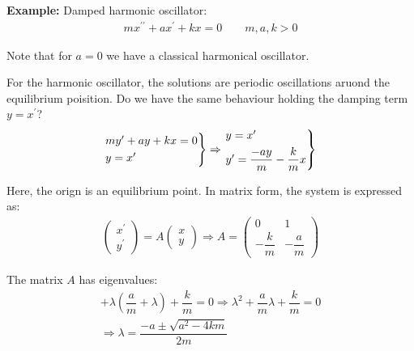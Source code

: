 \noindent\textbf{Example:} Damped harmonic oscillator:
\begin{equation*}
  \begin{gathered}
    mx^{\prime\prime}+ax^{\prime}+kx=0\qquad m,a,k>0
  \end{gathered}
\end{equation*}\par
\noindent Note that for $a = 0$ we have a classical harmonical oscillator.
\par\bigskip
\noindent For the harmonic oscillator, the solutions are periodic oscillations aruond the equilibrium poisition. Do we have the same behaviour holding the damping term $y = x^{\prime}$?
\begin{equation*}
  \begin{gathered}
    \begin{rcases*}
      my^{\prime}+ay+kx=0\\
      y=x^{\prime}
    \end{rcases*}\Rightarrow 
    \begin{rcases*}
      y=x^{\prime}\\
      y^{\prime}  = \dfrac{-ay}{m} - \dfrac{k}{m}x
    \end{rcases*}
  \end{gathered}
\end{equation*}
\par\bigskip
\noindent Here, the orign is an equilibrium point. In matrix form, the system is expressed as:
\begin{equation*}
  \begin{gathered}
    \begin{pmatrix}x^{\prime}\\y^{\prime}\end{pmatrix} = A\begin{pmatrix}x\\y\end{pmatrix}\Rightarrow A= \begin{pmatrix}0&1\\-\dfrac{k}{m}&-\dfrac{a}{m}\end{pmatrix}
  \end{gathered}
\end{equation*}\par
\noindent The matrix $A$ has eigenvalues:
\begin{equation*}
  \begin{gathered}
    +\lambda\left(\dfrac{a}{m}+\lambda\right) + \dfrac{k}{m} = 0\Rightarrow \lambda^2+\dfrac{a}{m}\lambda+\dfrac{k}{m} = 0\\
    \Rightarrow \lambda = \dfrac{-a\pm\sqrt{a^2-4km}}{2m}
  \end{gathered}
\end{equation*}
